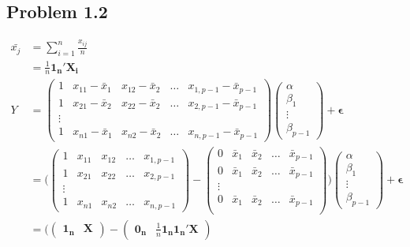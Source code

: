 \documentclass[a4paper]{article}
\begin{document}
\subsection*{Problem 1.2}
\begin{align*}
\bar{x_j} &= \sum_{i=1}^n \frac{x_{ij}}{n}\\
&= \frac{1}{n}\mathbf{1_n}'\mathbf{X_i}\\
Y &= \begin{pmatrix}
1 & x_{11}-\bar{x}_1 & x_{12}-\bar{x}_2 & \dots & x_{1,p-1}-\bar{x}_{p-1}\\
1 & x_{21}-\bar{x}_2 & x_{22}-\bar{x}_2 & \dots & x_{2, p-1}-\bar{x}_{p-1}\\
\vdots & \\
1 & x_{n1}-\bar{x}_1 & x_{n2}-\bar{x}_2 & \dots & x_{n,p-1}-\bar{x}_{p-1}
\end{pmatrix}\begin{pmatrix}
\alpha\\
\beta_1\\
\vdots\\
\beta_{p-1}
\end{pmatrix} + \mathbf{\epsilon}\\
&=\big(\begin{pmatrix}
1 & x_{11} & x_{12} & \dots & x_{1,p-1}\\
1 & x_{21} & x_{22} & \dots & x_{2, p-1}\\
\vdots & \\
1 & x_{n1} & x_{n2} & \dots & x_{n,p-1}
\end{pmatrix}- \begin{pmatrix}
0 & \bar{x}_1 & \bar{x}_2 & \dots & \bar{x}_{p-1}\\
0 & \bar{x}_1 & \bar{x}_2 & \dots & \bar{x}_{p-1}\\
\vdots & \\
0 & \bar{x}_1 & \bar{x}_2 & \dots & \bar{x}_{p-1}\\
\end{pmatrix} \big)\begin{pmatrix}
\alpha\\
\beta_1\\
\vdots\\
\beta_{p-1}
\end{pmatrix} + \mathbf{\epsilon}\\
&= \big(\begin{pmatrix}
\mathbf{1_n} & \mathbf{X}
\end{pmatrix} - \begin{pmatrix}
\mathbf{0_n} & \frac{1}{n}\mathbf{1_n1_n'X}

\end{pmatrix}
\end{align*}
\end{document}
